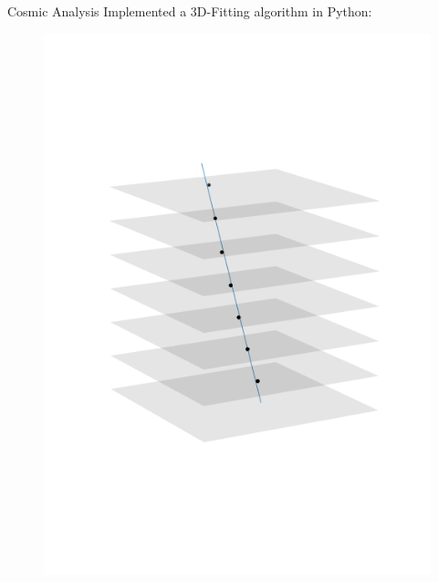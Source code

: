 \documentclass{beamer}
\begin{document}
\begin{frame}[fragile]{Cosmic Analysis}
    Implemented a 3D-Fitting algorithm in Python:\\
    \begin{minipage}{.32\textwidth}
	\begin{figure}[H]
	    \centering
	    \includegraphics[trim=0 80 0 80,clip,width=\textwidth]{example_1459.png}
	\end{figure}
    \end{minipage}
    \begin{minipage}{.32\textwidth}
	\begin{figure}[H]
	    \centering

\end{figure}
\end{minipage}
\end{frame}
\end{document}
